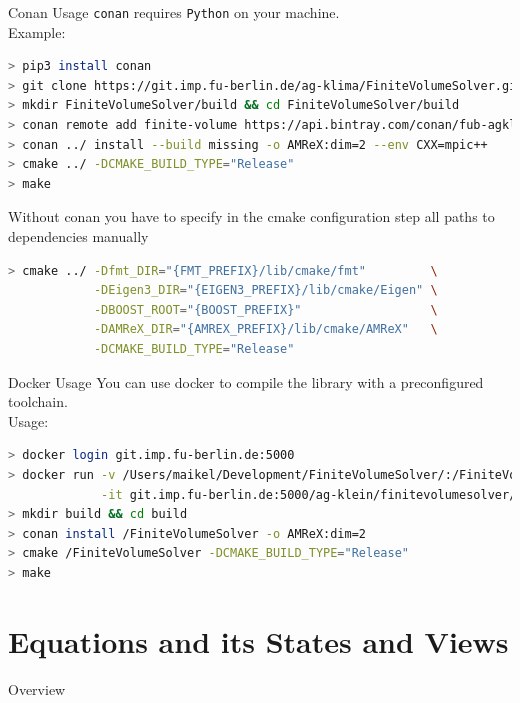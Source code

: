 \documentclass[ucs,9pt]{beamer}
\begin{document}
\begin{frame}[fragile]{Conan Usage}
\texttt{conan} requires \texttt{Python} on your machine.
\\
Example:
\begin{lstlisting}[language=bash]
> pip3 install conan
> git clone https://git.imp.fu-berlin.de/ag-klima/FiniteVolumeSolver.git FiniteVolumeSolver/
> mkdir FiniteVolumeSolver/build && cd FiniteVolumeSolver/build
> conan remote add finite-volume https://api.bintray.com/conan/fub-agklein/finite-volume
> conan ../ install --build missing -o AMReX:dim=2 --env CXX=mpic++
> cmake ../ -DCMAKE_BUILD_TYPE="Release"
> make
\end{lstlisting}

Without conan you have to specify in the cmake configuration step all paths to dependencies manually
\begin{lstlisting}[language=bash]
> cmake ../ -Dfmt_DIR="{FMT_PREFIX}/lib/cmake/fmt"         \
            -DEigen3_DIR="{EIGEN3_PREFIX}/lib/cmake/Eigen" \
            -DBOOST_ROOT="{BOOST_PREFIX}"                  \
            -DAMReX_DIR="{AMREX_PREFIX}/lib/cmake/AMReX"   \
            -DCMAKE_BUILD_TYPE="Release"
\end{lstlisting}
\end{frame}

\begin{frame}[fragile]{Docker Usage}
You can use docker to compile the library with a preconfigured toolchain.
\\
Usage:
\begin{lstlisting}[language=bash]
> docker login git.imp.fu-berlin.de:5000
> docker run -v /Users/maikel/Development/FiniteVolumeSolver/:/FiniteVolumeSolver \
             -it git.imp.fu-berlin.de:5000/ag-klein/finitevolumesolver/amrex:2d_gcc7
> mkdir build && cd build
> conan install /FiniteVolumeSolver -o AMReX:dim=2
> cmake /FiniteVolumeSolver -DCMAKE_BUILD_TYPE="Release"
> make
\end{lstlisting}
\end{frame}

\section{Equations and its States and Views}
\begin{frame}{Overview}
\tableofcontents[currentsection]
\end{frame}
\end{document}
